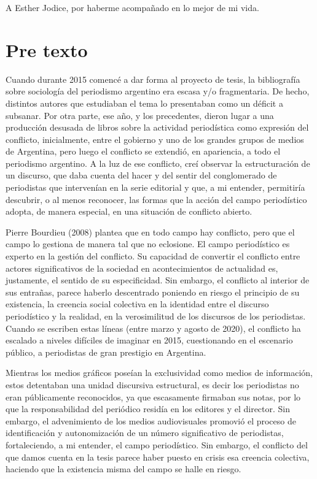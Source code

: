A Esther Jodice, por haberme acompañado en lo mejor de mi vida.

\chapter{Pre texto}

Cuando durante 2015 comencé a dar forma al proyecto de tesis, la bibliografía sobre sociología del periodismo argentino era escasa y/o fragmentaria. De hecho, distintos autores que estudiaban el tema lo presentaban como un déficit a subsanar. Por otra parte, ese año, y los precedentes, dieron lugar a una producción desusada de libros sobre la actividad periodística como expresión del conflicto, inicialmente, entre el gobierno y uno de los grandes grupos de medios de Argentina, pero luego el conflicto se extendió, en apariencia, a todo el periodismo argentino. A la luz de ese conflicto, creí observar la estructuración de un discurso, que daba cuenta del hacer y del sentir del conglomerado de periodistas que intervenían en la serie editorial y que, a mi entender, permitiría descubrir, o al menos reconocer, las formas que la acción del campo periodístico adopta, de manera especial, en una situación de conflicto abierto.

Pierre Bourdieu (2008) plantea que en todo campo hay conflicto, pero que el campo lo gestiona de manera tal que no eclosione. El campo periodístico es experto en la gestión del conflicto. Su capacidad de convertir el conflicto entre actores significativos de la sociedad en acontecimientos de actualidad es, justamente, el sentido de su especificidad. Sin embargo, el conflicto al interior de sus entrañas, parece haberlo descentrado poniendo en riesgo el principio de su existencia, la creencia social colectiva en la identidad entre el discurso periodístico y la realidad, en la verosimilitud de los discursos de los periodistas. Cuando se escriben estas líneas (entre marzo y agosto de 2020), el conflicto ha escalado a niveles difíciles de imaginar en 2015, cuestionando en el escenario público, a periodistas de gran prestigio en Argentina.

Mientras los medios gráficos poseían la exclusividad como medios de información, estos detentaban una unidad discursiva estructural, es decir los periodistas no eran públicamente reconocidos, ya que escasamente firmaban sus notas, por lo que la responsabilidad del periódico residía en los editores y el director. Sin embargo, el advenimiento de los medios audiovisuales promovió el proceso de identificación y autonomización de un número significativo de periodistas, fortaleciendo, a mi entender, el campo periodístico. Sin embargo, el conflicto del que damos cuenta en la tesis parece haber puesto en crisis esa creencia colectiva, haciendo que la existencia misma del campo se halle en riesgo.


